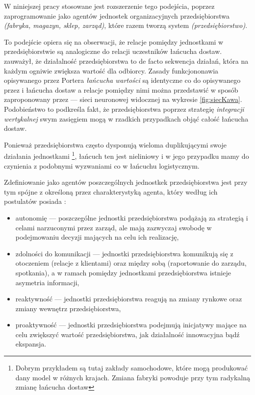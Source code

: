 \documentclass[polish, twoside, 12pt, a4paper]{article}
\theoremstyle{definition}
\theoremstyle{plain}
\theoremstyle{remark}
\begin{document}
W niniejszej pracy stosowane jest rozszerzenie tego podejścia, poprzez zaprogramowanie jako agentów jednostek organizacyjnych przedsiębiorstwa \textit{(fabryka, magazyn, sklep, zarząd)}, które razem tworzą system \textit{(przedsiębiorstwo)}. 

To podejście opiera się na obserwacji, że relacje pomiędzy jednostkami w przedsiębiorstwie są analogiczne do relacji uczestników łańcucha dostaw. \cite{Porter1985} zauważył, że działalność przedsiębiorstwa to de facto sekwencja działań, która na każdym ogniwie zwiększa wartość dla odbiorcy. Zasady funkcjononawia opisywanego przez Portera \textit{łańcucha wartości} są identyczne co do opisywanego przez \cite{Moyaux2006} i \cite{Kawa2010} łańcucha dostaw a relacje pomiędzy nimi można przedstawić w sposób zaproponowany przez \cite{Kawa2010} --- sieci neuronowej widocznej na wykresie \ref{fig:siecKawa}. Podobieństwo to podkreśla fakt, że przedsiębiorstwa poprzez strategię \textit{integracji wertykalnej} swym zasięgiem mogą w rzadkich przypadkach objąć całość łańcucha dostaw.  

Ponieważ przedsiębiorstwa często dysponują wieloma duplikującymi swoje działania jednostkami \footnote{Dobrym przykładem są tutaj zakłady samochodowe, które mogą produkować dany model w różnych krajach. Zmiana fabryki powoduje przy tym radykalną zmianę łańcucha dostaw}, łańcuch ten jest nieliniowy i w jego przypadku mamy do czynienia z podobnymi wyzwaniami co w łańcuchu logistycznym.

Zdefiniowanie jako agentów poszczególnych jednostkek przedsiębiorstwa jest przy tym spójne z określoną przez \cite{Wooldridge1995} charakterystyką agenta, który według ich postulatów posiada : 
	\begin{itemize}
		\item autonomię --- poszczególne jednostki przedsiębiorstwa podążają za strategią i celami narzuconymi przez zarząd, ale mają zazwyczaj swobodę w podejmowaniu decyzji mających na celu ich realizację,
		\item zdolności do komunikacji --- jednostki przedsiębiorstwa komunikują się z otoczeniem (relacje z klientami) oraz między sobą (raportowanie do zarządu, spotkania), a w ramach pomiędzy jednostkami przedsiębiorstwa istnieje asymetria informacji,
		\item reaktywność --- jednostki przedsiębiorstwa reagują na zmiany rynkowe oraz zmiany wewnętrz przedsiębiorstwa,
	 	\item proaktywność --- jednostki przedsiębiorstwa podejmują inicjatywy mające na celu zwiększyć wartość przedsiębiorstwa, jak działalność innowacyjna bądź ekspansja. 
	\end{itemize}
 
\end{document}
